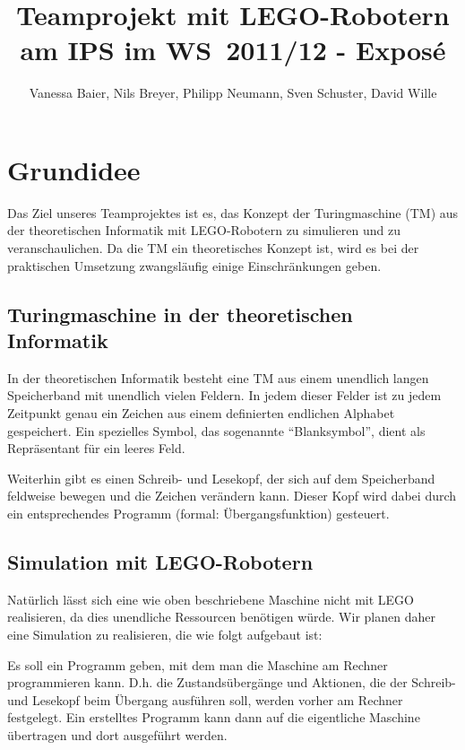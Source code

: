\documentclass[a4paper,12pt]{article}
\begin{document}
\newcommand{\TODO}[1]{{\bf{TODO: #1}}}

\author{Vanessa Baier, Nils Breyer, Philipp Neumann, Sven Schuster, David Wille}
\title{Teamprojekt mit LEGO-Robotern am IPS im \mbox{WS 2011/12} - Exposé}

\maketitle

\section{Grundidee}

Das Ziel unseres Teamprojektes ist es, das Konzept der Turingmaschine (TM) aus der theoretischen Informatik mit LEGO-Robotern zu simulieren und zu veranschaulichen. Da die TM ein theoretisches Konzept ist, wird es bei der praktischen Umsetzung zwangsläufig einige Einschränkungen geben.

\subsection{Turingmaschine in der theoretischen Informatik}

In der theoretischen Informatik besteht eine TM aus einem unendlich langen Speicherband mit unendlich vielen Feldern. In jedem dieser Felder ist zu jedem Zeitpunkt genau ein Zeichen aus einem definierten endlichen Alphabet gespeichert. Ein spezielles Symbol, das sogenannte "`Blanksymbol"', dient als Repräsentant für ein leeres Feld.
 
Weiterhin gibt es einen Schreib- und Lesekopf, der sich auf dem Speicherband feldweise bewegen und die Zeichen verändern kann. Dieser Kopf wird dabei durch ein entsprechendes Programm (formal: Übergangsfunktion) gesteuert.

\subsection{Simulation mit LEGO-Robotern}

Natürlich lässt sich eine wie oben beschriebene Maschine nicht mit LEGO realisieren, da dies unendliche Ressourcen benötigen würde. Wir planen daher eine Simulation zu realisieren, die wie folgt aufgebaut ist:

Es soll ein Programm geben, mit dem man die Maschine am Rechner programmieren kann. D.h. die Zustandsübergänge und Aktionen, die der Schreib- und Lesekopf beim Übergang ausführen soll, werden vorher am Rechner festgelegt. Ein erstelltes Programm kann dann auf die eigentliche Maschine übertragen und dort ausgeführt werden.
\end{document}
